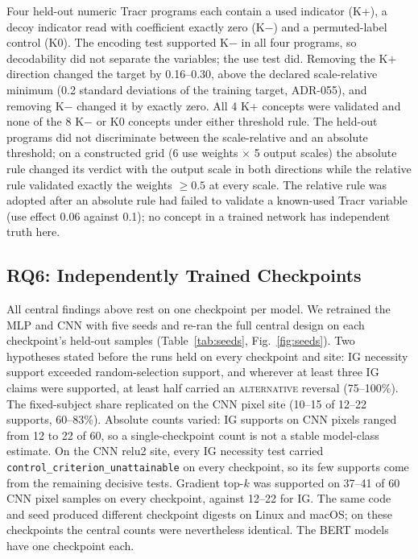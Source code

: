 Four held-out numeric Tracr programs each contain a used indicator (K+), a decoy indicator read with coefficient exactly zero (K$-$) and a permuted-label control (K0). The encoding test supported K$-$ in all four programs, so decodability did not separate the variables; the use test did. Removing the K+ direction changed the target by 0.16--0.30, above the declared scale-relative minimum (0.2 standard deviations of the training target, ADR-055), and removing K$-$ changed it by exactly zero. All 4 K+ concepts were validated and none of the 8 K$-$ or K0 concepts under either threshold rule. The held-out programs did not discriminate between the scale-relative and an absolute threshold; on a constructed grid (6 use weights $\times$ 5 output scales) the absolute rule changed its verdict with the output scale in both directions while the relative rule validated exactly the weights $\ge 0.5$ at every scale. The relative rule was adopted after an absolute rule had failed to validate a known-used Tracr variable (use effect 0.06 against 0.1); no concept in a trained network has independent truth here.

\subsection{RQ6: Independently Trained Checkpoints}
\label{sec:res-seeds}

All central findings above rest on one checkpoint per model. We retrained the MLP and CNN with five seeds and re-ran the full central design on each checkpoint's held-out samples (Table~\ref{tab:seeds}, Fig.~\ref{fig:seeds}). Two hypotheses stated before the runs held on every checkpoint and site: IG necessity support exceeded random-selection support, and wherever at least three IG claims were supported, at least half carried an \textsc{alternative} reversal (75--100\%). The fixed-subject share replicated on the CNN pixel site (10--15 of 12--22 supports, 60--83\%). Absolute counts varied: IG supports on CNN pixels ranged from 12 to 22 of 60, so a single-checkpoint count is not a stable model-class estimate. On the CNN relu2 site, every IG necessity test carried \texttt{control\_criterion\_unattainable} on every checkpoint, so its few supports come from the remaining decisive tests. Gradient top-$k$ was supported on 37--41 of 60 CNN pixel samples on every checkpoint, against 12--22 for IG. The same code and seed produced different checkpoint digests on Linux and macOS; on these checkpoints the central counts were nevertheless identical. The BERT models have one checkpoint each.

